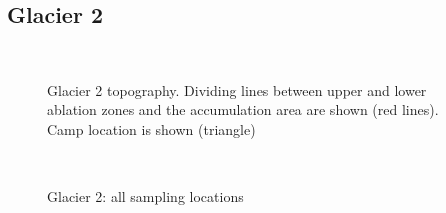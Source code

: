 \documentclass{sfuthesis}
\begin{document}
\begin{appendices}
\section*{Glacier 2}
	\begin{figure}[H]
	\centering	
	\\
\caption[]{Glacier 2 topography. Dividing lines between upper and lower ablation zones and the accumulation area are shown (red lines). Camp location is shown (triangle) }
\end{figure}
	\begin{figure}[H]
	\centering
	\\
\caption[]{Glacier 2: all sampling locations}
\end{figure}

\end{appendices}
\end{document}
